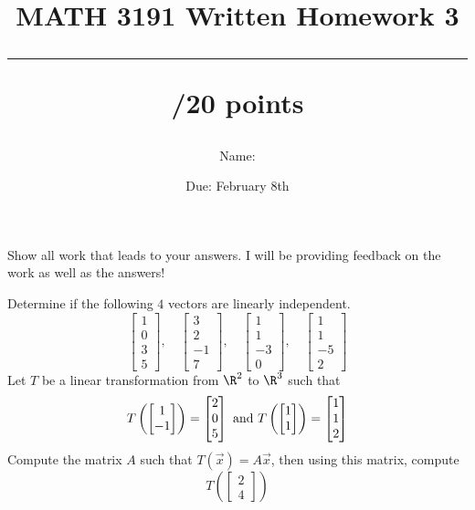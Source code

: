 \documentclass{exam}
\title{MATH 3191 Written Homework 3\\\rule{30pt}{1pt}/20 points}
\author{Name: \rule{150pt}{1pt}}
\date{Due: February 8th}
\begin{document}
\maketitle
Show all work that leads to your answers. I will be providing feedback on the work as well as the answers!
\begin{questions}
    \question[10] Determine if the following $4$ vectors are linearly independent.
    \[
        \begin{bmatrix}
            1\\0\\3\\5
        \end{bmatrix},\quad
        \begin{bmatrix}
            3\\2\\-1\\7
        \end{bmatrix},\quad
        \begin{bmatrix}
            1\\1\\-3\\0
        \end{bmatrix},\quad
        \begin{bmatrix}
            1\\1\\-5\\2
        \end{bmatrix}
    \]
    \newpage
    \question[10]Let $T$ be a linear transformation from $\R^2$ to $\R^3$ such that
    \[
        T\left(\begin{bmatrix}1\\-1\end{bmatrix}\right) = \begin{bmatrix}2\\0\\5\end{bmatrix}
            \textnormal{ and }
            T\left(\begin{bmatrix}1\\1\end{bmatrix}\right) = \begin{bmatrix}1\\1\\2\end{bmatrix}
    \]
    Compute the matrix $A$ such that $T(\vec{x}) = A\vec{x}$, then using this matrix, compute
    \[
        T\left(\begin{bmatrix}2\\4\end{bmatrix}\right)
    \]
\end{questions}
\end{document}
